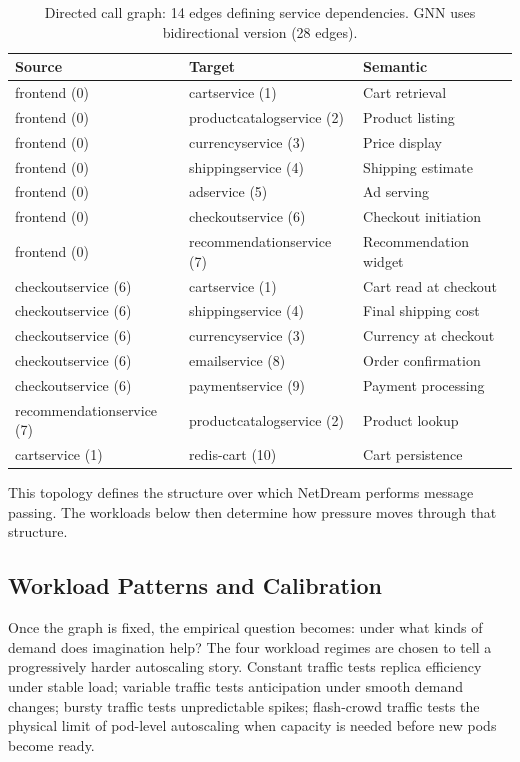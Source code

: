 \begin{table}[H]
\centering
\small
\caption{Directed call graph: 14 edges defining service dependencies.
GNN uses bidirectional version (28 edges).}
\label{tab:edges}
\begin{tabular}{@{}lll@{}}
\toprule
Source & Target & Semantic \\
\midrule
frontend (0) & cartservice (1) & Cart retrieval \\
frontend (0) & productcatalogservice (2) & Product listing \\
frontend (0) & currencyservice (3) & Price display \\
frontend (0) & shippingservice (4) & Shipping estimate \\
frontend (0) & adservice (5) & Ad serving \\
frontend (0) & checkoutservice (6) & Checkout initiation \\
frontend (0) & recommendationservice (7) & Recommendation widget \\
checkoutservice (6) & cartservice (1) & Cart read at checkout \\
checkoutservice (6) & shippingservice (4) & Final shipping cost \\
checkoutservice (6) & currencyservice (3) & Currency at checkout \\
checkoutservice (6) & emailservice (8) & Order confirmation \\
checkoutservice (6) & paymentservice (9) & Payment processing \\
recommendationservice (7) & productcatalogservice (2) & Product lookup \\
cartservice (1) & redis-cart (10) & Cart persistence \\
\bottomrule
\end{tabular}
\end{table}

This topology defines the structure over which NetDream performs message
passing.  The workloads below then determine how pressure moves through
that structure.

\subsection{Workload Patterns and Calibration}
\label{app:workloads}

Once the graph is fixed, the empirical question becomes: under what kinds
of demand does imagination help?  The four workload regimes are chosen
to tell a progressively harder autoscaling story.  Constant traffic tests
replica efficiency under stable load; variable traffic tests anticipation
under smooth demand changes; bursty traffic tests unpredictable spikes;
flash-crowd traffic tests the physical limit of pod-level autoscaling
when capacity is needed before new pods become ready.

